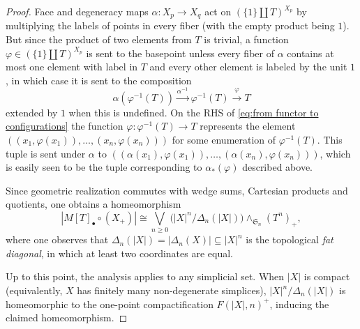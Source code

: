 \documentclass[10pt,a4paper]{amsart}
\newcommand{\SymGroup}[1][n]{\mathfrak{S}_{#1}}
\begin{document}
\begin{proof}
Face and degeneracy maps $\alpha: X_p\to X_q$ act on $(\{1\}\coprod T)^{X_p}$ by multiplying the labels of points in every fiber (with the empty product being $1$). But since the product of two elements from $T$ is trivial, a function $\varphi\in (\{1\}\coprod T)^{X_p}$ is sent to the basepoint unless every fiber of $\alpha$ contains at most one element with label in $T$ and every other element is labeled by the unit $1$, in which case it is sent to the composition 
\[
\alpha(\varphi^{-1}(T)) \overset{\alpha^{-1}}{\longrightarrow} \varphi^{-1}(T) \overset{\varphi}\longrightarrow T
\]
extended by $1$ when this is undefined. On the RHS of \eqref{eq:from functor to configurations} the function $\varphi: \varphi^{-1}(T)\to T$ represents the element $((x_1,\varphi(x_1)),\ldots, (x_n,\varphi(x_n)))$ for some enumeration of $\varphi^{-1}(T)$. This tuple is sent under $\alpha$ to $((\alpha(x_1),\varphi(x_1)),\ldots, (\alpha(x_n),\varphi(x_n)))$, which is easily seen to be the tuple corresponding to $\alpha_*(\varphi)$ described above. 



Since geometric realization commutes with wedge sums, Cartesian products and quotients, one obtains a homeomorphism
\[
    |M[T]_{\bullet}\circ(X_+)| \cong \bigvee_{n\geq 0}{\Big(|X|^n/\Delta_n(|X|)\Big)\wedge_{\SymGroup}(T^n)_+},
\]
where one observes that $\Delta_n(|X|) = |\Delta_n(X)|\subseteq |X|^n$ is the topological \emph{fat diagonal}, in which at least two coordinates are equal.

Up to this point, the analysis applies to any simplicial set. When $|X|$ is compact (equivalently, $X$ has finitely many non-degenerate simplices), $|X|^n/\Delta_n(|X|)$ is homeomorphic to the one-point compactification $F(|X|, n)^+$, inducing the claimed homeomorphism.
\end{proof}
\end{document}
